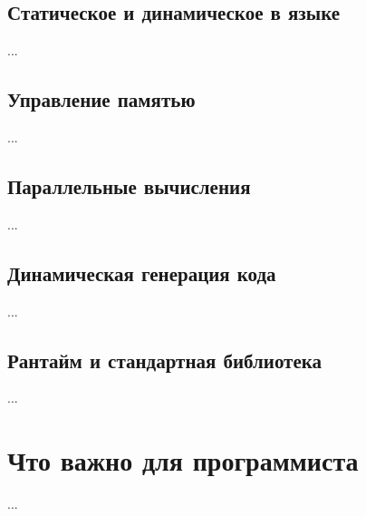 \documentclass[11pt]{book}
\begin{document}
\subsection{Статическое и динамическое в языке}
...
\subsection{Управление памятью}
...
\subsection{Параллельные вычисления}
...
\subsection{Динамическая генерация кода}
...
\subsection{Рантайм и стандартная библиотека}
...
\section{Что важно для программиста}
...
\end{document}
